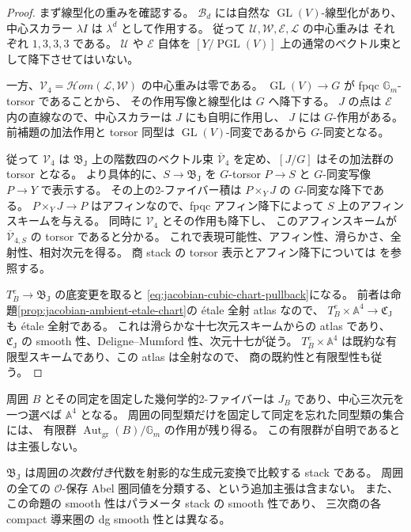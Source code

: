 \begin{proof}
まず線型化の重みを確認する。
$\mathcal B_d$ には自然な $\operatorname{GL}(V)$-線型化があり、
中心スカラー $\lambda I$ は $\lambda^d$ として作用する。
従って $\mathcal U,\mathcal W,\mathcal E,\mathcal L$ の中心重みは
それぞれ $1,3,3,3$ である。
$\mathcal U$ や $\mathcal E$ 自体を
$[Y/\operatorname{PGL}(V)]$ 上の通常のベクトル束として降下させてはいない。

一方、$\mathcal V_4=\mathcal Hom(\mathcal L,\mathcal W)$ の中心重みは零である。
$\operatorname{GL}(V)\to G$ が fpqc $\mathbb G_m$-torsor であることから、
その作用写像と線型化は $G$ へ降下する。
$J$ の点は $\mathcal E$ 内の直線なので、中心スカラーは $J$ にも自明に作用し、
$J$ には $G$-作用がある。
前補題の加法作用と torsor 同型は $\operatorname{GL}(V)$-同変であるから
$G$-同変となる。

従って $\mathcal V_4$ は $\mathfrak B_{\mathrm J}$ 上の階数四のベクトル束
$\overline{\mathcal V}_4$ を定め、$[J/G]$ はその加法群の torsor となる。
より具体的に、$S\to\mathfrak B_{\mathrm J}$ を
$G$-torsor $P\to S$ と $G$-同変写像 $P\to Y$ で表示する。
その上の2-ファイバー積は
$P\times_YJ$ の $G$-同変な降下である。
$P\times_YJ\to P$ はアフィンなので、fpqc アフィン降下によって
$S$ 上のアフィンスキームを与える。
同時に $\mathcal V_4$ とその作用も降下し、
このアフィンスキームが $\overline{\mathcal V}_{4,S}$ の torsor であると分かる。
これで表現可能性、アフィン性、滑らかさ、全射性、相対次元を得る。
商 stack の torsor 表示とアフィン降下については
\cite[Section~95.15 and Lemma~35.37.1]{StacksAlgebraicChart}を参照する。

$T_B^e\to\mathfrak B_{\mathrm J}$ の底変更を取ると
\eqref{eq:jacobian-cubic-chart-pullback}になる。
前者は命題\ref{prop:jacobian-ambient-etale-chart}の étale 全射 atlas なので、
$T_B^e\times\mathbb A^4\to\mathfrak C_{\mathrm J}$ も étale 全射である。
これは滑らかな十七次元スキームからの atlas であり、
$\mathfrak C_{\mathrm J}$ の smooth 性、Deligne--Mumford 性、次元十七が従う。
$T_B^e\times\mathbb A^4$ は既約な有限型スキームであり、この atlas は全射なので、
商の既約性と有限型性も従う。
\end{proof}

\begin{remark}[ファイバーと標識の範囲]
周囲 $B$ とその同定を固定した幾何学的2-ファイバーは
$J_B$ であり、中心三次元を一つ選べば $\mathbb A^4$ となる。
周囲の同型類だけを固定して同定を忘れた同型類の集合には、
有限群 $\operatorname{Aut}_{\mathrm{gr}}(B)/\mathbb G_m$ の作用が残り得る。
この有限群が自明であるとは主張しない。

$\mathfrak B_{\mathrm J}$ は周囲の\emph{次数付き}代数を射影的な生成元変換で比較する stack である。
周囲の全ての $\mathcal O$-保存 Abel 圏同値を分類する、という追加主張は含まない。
また、この命題の smooth 性はパラメータ stack の smooth 性であり、
三次商の各 compact 導来圏の dg smooth 性とは異なる。
\end{remark}


